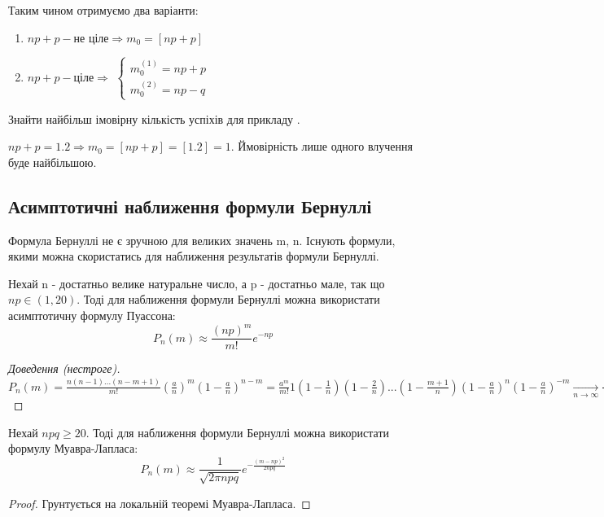 Таким чином отримуємо два варіанти:
\begin{enumerate}
    \item $np+p - \text{не ціле} \Rightarrow m_0 = \left[np+p\right]$
    \item $np+p - \text{ціле} \Rightarrow $
    $
    \begin{cases}
        m_0^{(1)} = np+p \\
        m_0^{(2)} = np-q
    \end{cases}
    $
\end{enumerate}

\begin{example}
    Знайти найбільш імовірну кількість успіхів для прикладу .

    $np + p = 1.2 \Rightarrow m_0 = \left[np + p\right] = \left[1.2\right] = 1$.
    Ймовірність лише одного влучення буде найбільшою.
\end{example}

\subsection{Асимптотичні наближення формули Бернуллі}
Формула Бернуллі не є зручною для великих значень m, n. Існують формули, якими можна 
скористатись для наближення результатів формули Бернуллі.
\begin{proposition}
    Нехай n - достатньо велике натуральне число, а p - достатньо мале, так що 
    $np \in (1, 20)$. Тоді для наближення формули Бернуллі можна використати 
    асимптотичну формулу Пуассона:
    $$P_n(m) \approx \frac{(np)^m}{m!}e^{-np}$$
\end{proposition}
\begin{proof}[Доведення (нестроге)]
    $P_n(m) = \frac{n(n-1)...(n-m+1)}{m!} \left(\frac{a}{n}\right)^m 
    (1-\frac{a}{n})^{n-m} = \frac{a^m}{m!} 1(1 - \frac{1}{n})(1 - \frac{2}{n})
    ...(1 - \frac{m+1}{n})(1-\frac{a}{n})^n (1-\frac{a}{n})^{-m} 
    \underset{n \rightarrow \infty}{\longrightarrow} \frac{(np)^m}{m!}e^{-np}$
\end{proof}
\begin{proposition}
    Нехай $npq \geq 20$. Тоді для наближення формули Бернуллі можна використати 
    формулу Муавра-Лапласа:
    $$P_n(m) \approx \frac{1}{\sqrt{2\pi npq}} e^{-\frac{(m-np)^2}{2npq}}$$
\end{proposition}
\begin{proof}
    Грунтується на локальній теоремі Муавра-Лапласа.
\end{proof}